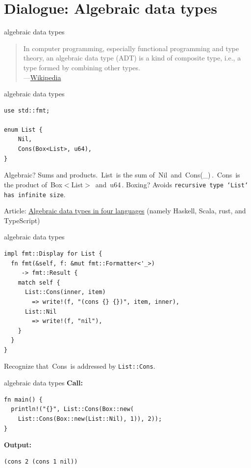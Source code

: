 \documentclass{beamer}
\newcommand\code[1]{\,{\color[HTML]{884400}#1}\,}
\begin{document}
\section{Dialogue: Algebraic data types}

\begin{frame}[fragile]{algebraic data types}
  \begin{quote}
    In computer programming, especially functional programming and type theory, an algebraic data type (ADT) is a kind of composite type, i.e., a type formed by combining other types. \\
    ---\href{https://en.wikipedia.org/wiki/Algebraic_data_type}{Wikipedia}
  \end{quote}
\end{frame}

\begin{frame}[fragile]{algebraic data types}
  \begin{verbatim}
use std::fmt;

enum List {
    Nil,
    Cons(Box<List>, u64),
}
  \end{verbatim}
  Algebraic? Sums and products. \code{List} is the sum of \code{Nil} and \code{Cons(\_)}. \code{Cons} is the product of \code{Box$<$List$>$} and \code{u64}.
  Boxing? Avoids \texttt{recursive type `List` has infinite size}.

  Article: \href{https://blog.softwaremill.com/algebraic-data-types-in-four-languages-858788043d4e}{Algebraic data types in four languages} (namely Haskell, Scala, rust, and TypeScript)
\end{frame}

\begin{frame}[fragile]{algebraic data types}
  \begin{verbatim}
impl fmt::Display for List {
  fn fmt(&self, f: &mut fmt::Formatter<'_>)
     -> fmt::Result {
    match self {
      List::Cons(inner, item)
        => write!(f, "(cons {} {})", item, inner),
      List::Nil
        => write!(f, "nil"),
    }
  }
}
  \end{verbatim}
  Recognize that \code{Cons} is addressed by \texttt{List::Cons}.
\end{frame}

\begin{frame}[fragile]{algebraic data types}
  \textbf{Call:}
  \begin{verbatim}
fn main() {
  println!("{}", List::Cons(Box::new(
    List::Cons(Box::new(List::Nil), 1)), 2));
}
  \end{verbatim}
  \textbf{Output:}
  \begin{verbatim}
(cons 2 (cons 1 nil))
  \end{verbatim}
\end{frame}
\end{document}
